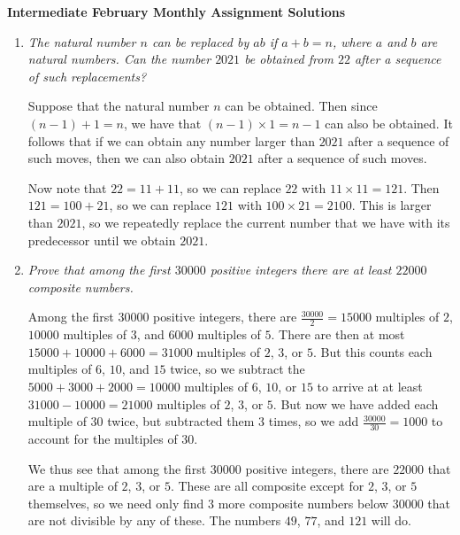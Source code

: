 \documentclass{article}
\begin{document}
\thispagestyle{empty}

\begin{center}
  \textbf{\Large Intermediate February Monthly Assignment Solutions}
\end{center}

\vspace{12pt}

\begin{enumerate}[1.]

\vspace{6pt}
\item %
{\itshape The natural number $n$ can be replaced by $ab$ if $a + b = n$, where $a$ and $b$ are natural numbers. Can the number $2021$ be obtained from $22$ after a sequence of such
replacements?}

Suppose that the natural number $n$ can be obtained. Then since $(n - 1) + 1 = n$, we have that $(n - 1) \times 1 = n - 1$ can also be obtained. It follows that if we can obtain any number larger than $2021$ after a sequence of such moves, then we can also obtain $2021$ after a sequence of such moves.

Now note that $22 = 11 + 11$, so we can replace $22$ with $11 \times 11 = 121$. Then $121 = 100 + 21$, so we can replace $121$ with $100 \times 21 = 2100$. This is larger than $2021$, so we repeatedly replace the current number that we have with its predecessor until we obtain $2021$.


\vspace{6pt}
\item %
{\itshape Prove that among the first $30000$ positive integers there are at least $22000$ composite numbers.}

Among the first $30000$ positive integers, there are $\frac{30000}{2} = 15000$ multiples of $2$, $10000$ multiples of $3$, and $6000$ multiples of $5$. There are then at most $15000 + 10000 + 6000 = 31000$ multiples of $2$, $3$, or $5$. But this counts each multiples of $6$, $10$, and $15$ twice, so we subtract the $5000 + 3000 + 2000 = 10000$ multiples of $6$, $10$, or $15$ to arrive at at least $31000 - 10000 = 21000$ multiples of $2$, $3$, or $5$. But now we have added each multiple of $30$ twice, but subtracted them $3$ times, so we add $\frac{30000}{30} = 1000$ to account for the multiples of $30$.

We thus see that among the first $30000$ positive integers, there are $22000$ that are a multiple of $2$, $3$, or $5$. These are all composite except for $2$, $3$, or $5$ themselves, so we need only find $3$ more composite numbers below $30000$ that are not divisible by any of these. The numbers $49$, $77$, and $121$ will do.



\end{enumerate}
\end{document}
